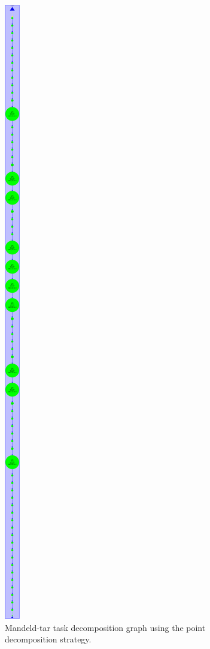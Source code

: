 \documentclass[12pt, a4paper]{article}
\begin{document}
\begin{figure}[H]
	\centering
	\includegraphics[scale=0.106]{./mandeld-tar_point}
	\caption{Mandeld-tar task decomposition graph using the point decomposition strategy.}
	\label{fig:mandeld-tar-point}
\end{figure}
\end{document}
